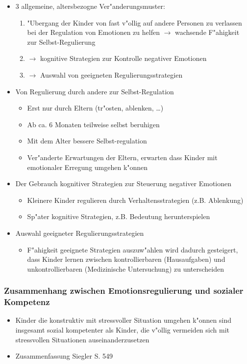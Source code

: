 \begin{itemize}
	\item
		3 allgemeine, altersbezogne Ver"anderungsmuster:
		\begin{enumerate}
			\item
				"Ubergang der Kinder von fast v"ollig auf andere Personen zu verlassen bei der Regulation von Emotionen zu helfen $\rightarrow$ wachsende F"ahigkeit zur Selbst-Regulierung
			\item
				$\rightarrow$ kognitive Strategien zur Kontrolle negativer Emotionen
			\item
				$\rightarrow$ 
				Auswahl von geeigneten Regulierungsstrategien
		\end{enumerate}
	\item
		Von Regulierung durch andere zur Selbst-Regulation
		\begin{itemize}
			\item
				Erst nur durch Eltern (tr"osten, ablenken, \dots)
			\item
				Ab ca. 6 Monaten teilweise selbst beruhigen
			\item
				Mit dem Alter bessere Selbst-regulation
			\item
				Ver"anderte Erwartungen der Eltern, erwarten dass Kinder mit emotionaler Erregung umgehen k"onnen
		\end{itemize}
	\item
		Der Gebrauch kognitiver Strategien zur Steuerung negativer Emotionen
		\begin{itemize}
			\item
				Kleinere Kinder regulieren durch Verhaltensstrategien (z.B. Ablenkung)
			\item
				Sp"ater kognitive Strategien, z.B. Bedeutung herunterspielen
		\end{itemize}

	\item
		Auswahl geeigneter Regulierungsstrategien
		\begin{itemize}
			\item
				F"ahigkeit geeignete Strategien auszuw"ahlen wird dadurch gesteigert, dass Kinder lernen zwischen kontrollierbaren (Hausaufgaben) und unkontrollierbaren (Medizinische Untersuchung) zu unterscheiden
		\end{itemize}
\end{itemize}

\subsubsection{Zusammenhang zwischen Emotionsregulierung und sozialer Kompetenz}
\begin{itemize}
	\item
		Kinder die konstruktiv mit stressvoller Situation umgehen k"onnen sind insgesamt sozial kompetenter als Kinder, die v"ollig vermeiden sich mit stressvollen Situationen auseinanderzusetzen
	\item
		Zusammenfassung Siegler S. 549
\end{itemize}



